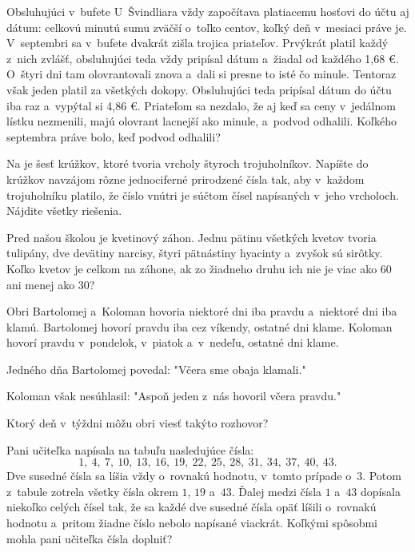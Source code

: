 {%
Obsluhujúci v~bufete U~Švindliara vždy započítava platiacemu hosťovi do účtu
aj dátum: celkovú minutú sumu zväčší o~toľko centov, koľký deň
v~mesiaci práve je.
V~septembri sa v~bufete dvakrát zišla trojica priateľov. Prvýkrát platil každý
z~nich zvlášť, obsluhujúci teda vždy pripísal dátum a~žiadal od každého 1{,}68 €.
O~štyri dni tam olovrantovali znova a~dali si presne to isté čo minule. Tentoraz
však jeden platil za všetkých dokopy. Obsluhujúci teda pripísal dátum do účtu
iba raz a~vypýtal si 4{,}86 €. Priateľom sa nezdalo, že aj keď sa ceny v~jedálnom
lístku nezmenili, majú olovrant lacnejší ako minule, a~podvod odhalili. Koľkého septembra práve bolo, keď podvod odhalili?}

{%
Na \obr{} je šesť krúžkov, ktoré tvoria vrcholy štyroch trojuholníkov.
Napíšte do krúžkov navzájom rôzne jednociferné prirodzené čísla tak, aby
v~každom trojuholníku platilo, že číslo vnútri je súčtom čísel napísaných
v~jeho vrcholoch.
Nájdite všetky riešenia.
%
}

{%
Pred našou školou je kvetinový záhon. Jednu pätinu všetkých kvetov tvoria tulipány, dve devätiny narcisy, štyri pätnástiny hyacinty a~zvyšok sú sirôtky. Koľko kvetov je celkom na záhone, ak zo žiadneho druhu ich nie je viac ako 60 ani menej ako 30?}

{%
Obri Bartolomej a~Koloman hovoria niektoré dni iba pravdu a~niektoré dni iba klamú.
Bartolomej hovorí pravdu iba cez víkendy, ostatné dni klame. Koloman hovorí pravdu v~pondelok, v~piatok a~v~nedeľu, ostatné dni klame.

Jedného dňa Bartolomej povedal: "Včera sme obaja klamali."

Koloman však nesúhlasil: "Aspoň jeden z~nás hovoril včera pravdu."

\noindent
Ktorý deň v~týždni môžu obri viesť takýto rozhovor?}

{%
Pani učiteľka napísala na tabuľu nasledujúce čísla:
$$
1,\ 4,\ 7,\  10,\ 13,\ 16,\ 19,\ 22,\ 25,\ 28,\ 31,\ 34,\ 37,\ 40,\ 43.
$$
Dve susedné čísla sa líšia vždy o~rovnakú hodnotu, v~tomto prípade o~$3$.
Potom z~tabule zotrela všetky čísla okrem $1$, $19$ a~$43$.
Ďalej medzi čísla $1$ a~$43$ dopísala niekoľko celých čísel tak, že sa každé dve susedné
čísla opäť líšili o~rovnakú hodnotu a~pritom žiadne číslo nebolo napísané viackrát.
Koľkými spôsobmi mohla pani učiteľka čísla doplniť?}


